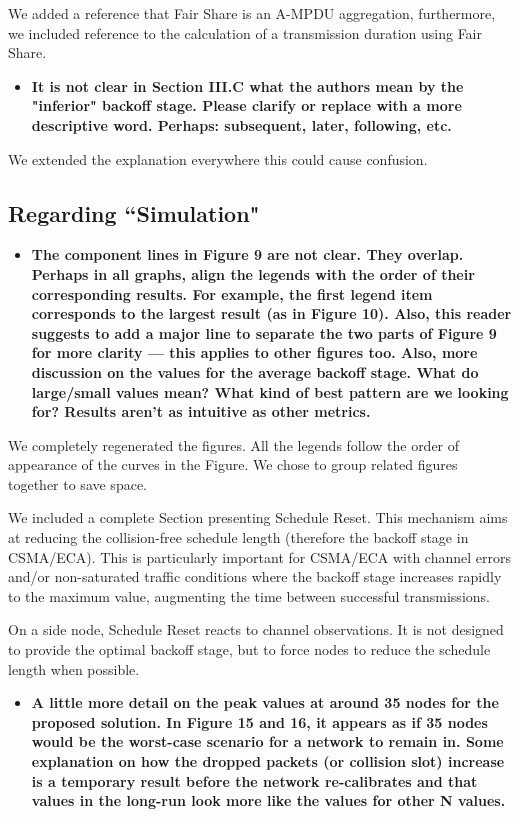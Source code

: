 \documentclass[]{article}
\begin{document}
		We added a reference that Fair Share is an A-MPDU aggregation, furthermore, we included reference to the calculation of a transmission duration using Fair Share. 		
		
		\begin{itemize}
			\item {\bfseries It is not clear in Section III.C what the authors mean by the "inferior" backoff stage. Please clarify or replace with a more descriptive word. Perhaps: subsequent, later, following, etc.}
		\end{itemize}
		
		We extended the explanation everywhere this could cause confusion. 
		
	\subsection{Regarding ``Simulation"}
		\begin{itemize}
			\item {\bfseries The component lines in Figure 9 are not clear. They overlap. Perhaps in all graphs, align the legends with the order of their corresponding results. For example, the first legend item corresponds to the largest result (as in Figure 10). Also, this reader suggests to add a major line to separate the two parts of Figure 9 for more clarity --- this applies to other figures too. Also, more discussion on the values for the average backoff stage. What do large/small values mean? What kind of best pattern are we looking for? Results aren't as intuitive as other metrics.}
		\end{itemize}
		
		We completely regenerated the figures. All the legends follow the order of appearance of the curves in the Figure. We chose to group related figures together to save space.
		
		We included a complete Section presenting Schedule Reset. This mechanism aims at reducing the collision-free schedule length (therefore the backoff stage in CSMA/ECA). This is particularly important for CSMA/ECA with channel errors and/or non-saturated traffic conditions where the backoff stage increases rapidly to the maximum value, augmenting the time between successful transmissions.
		
		On a side node, Schedule Reset reacts to channel observations. It is not designed to provide the optimal backoff stage, but to force nodes to reduce the schedule length when possible.
		
		\begin{itemize}
			\item {\bf A little more detail on the peak values at around 35 nodes for the proposed solution. In Figure 15 and 16, it appears as if 35 nodes would be the worst-case scenario for a network to remain in. Some explanation on how the dropped packets (or collision slot) increase is a temporary result before the network re-calibrates and that values in the long-run look more like the values for other N values.}
		\end{itemize}
		
\end{document}
